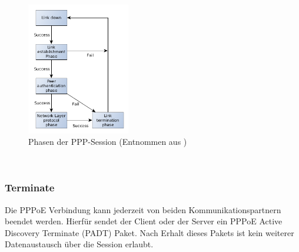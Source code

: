 \documentclass[journal,11pt]{IEEEtran}
\begin{document}
\begin{figure}[h!]
 \centering
  \includegraphics[width=0.4\textwidth]{img/ppp_linkstates.png}
 \caption{Phasen der PPP-Session (Entnommen aus \cite{ppp_oracle})}
 \label{fig:ppp_oracle_ablauf}
\end{figure}
%
\\
\subsubsection{Terminate}
Die PPPoE Verbindung kann jederzeit von beiden Kommunikationspartnern beendet werden. Hierfür sendet
der Client oder der Server ein PPPoE Active Discovery Terminate (PADT) Paket. Nach Erhalt dieses
Pakets ist kein weiterer Datenaustausch über die Session erlaubt.
\\
%
\end{document}
